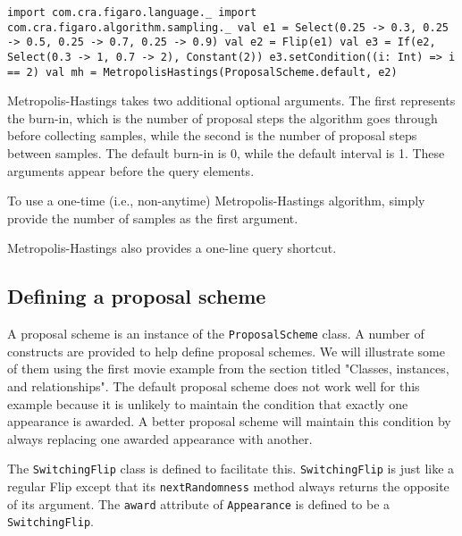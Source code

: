 \begin{flushleft}
\texttt{import com.cra.figaro.language.\_
\newline import com.cra.figaro.algorithm.sampling.\_
\newline 
\newline val e1 = Select(0.25 -> 0.3, 0.25 -> 0.5, 0.25 -> 0.7, 0.25 -> 0.9)
\newline val e2 = Flip(e1)
\newline val e3 = If(e2, Select(0.3 -> 1, 0.7 -> 2), Constant(2))
\newline e3.setCondition((i: Int) => i == 2)
\newline 
\newline val mh = MetropolisHastings(ProposalScheme.default, e2)
}
\end{flushleft}

Metropolis-Hastings takes two additional optional arguments. The first represents the burn-in, which is the number of proposal steps the algorithm goes through before collecting samples, while the second is the number of proposal steps between samples. The default burn-in is 0, while the default interval is 1. These arguments appear before the query elements.

To use a one-time (i.e., non-anytime) Metropolis-Hastings algorithm, simply provide the number of samples as the first argument.

Metropolis-Hastings also provides a one-line query shortcut.

\subsection{Defining a proposal scheme}

A proposal scheme is an instance of the \texttt{ProposalScheme} class. A number of constructs are provided to help define proposal schemes. We will illustrate some of them using the first movie example from the section titled "Classes, instances, and relationships". The default proposal scheme does not work well for this example because it is unlikely to maintain the condition that exactly one appearance is awarded. A better proposal scheme will maintain this condition by always replacing one awarded appearance with another.

The \texttt{SwitchingFlip} class is defined to facilitate this. \texttt{SwitchingFlip} is just like a regular Flip except that its \texttt{nextRandomness} method always returns the opposite of its argument. The \texttt{award} attribute of \texttt{Appearance} is defined to be a \texttt{SwitchingFlip}. 

